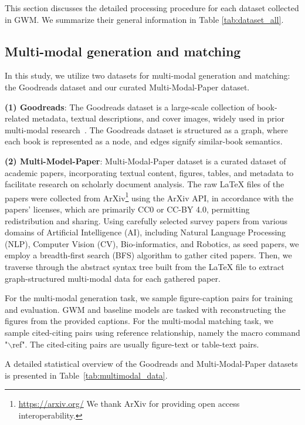 This section discusses the detailed processing procedure for each dataset collected in GWM. We summarize their general information in Table \ref{tab:dataset_all}.

\subsection{Multi-modal generation and matching} \label{ap:multi-modal generation and matching g}

 In this study, we utilize two datasets for multi-modal generation and matching: the Goodreads dataset \cite{wan-etal-2019-fine} and our curated Multi-Modal-Paper dataset. 

\textbf{(1) Goodreads}: The Goodreads dataset is a large-scale collection of book-related metadata, textual descriptions, and cover images, widely used in prior multi-modal research~\cite{jin2024instructg2i}. 
The Goodreads dataset is structured as a graph, where each book is represented as a node, and edges signify similar-book semantics.

\textbf{(2) Multi-Model-Paper}: Multi-Modal-Paper dataset is a curated dataset of academic papers, incorporating textual content, figures, tables, and metadata to facilitate research on scholarly document analysis. The raw LaTeX files of the papers were collected from ArXiv\footnote{\href{https://arxiv.org/}{https://arxiv.org/} We thank ArXiv for providing open access interoperability.} using the ArXiv API, in accordance with the papers' licenses, which are primarily CC0 or CC-BY 4.0, permitting redistribution and sharing. Using carefully selected survey papers from various domains of Artificial Intelligence (AI), including Natural Language Processing (NLP), Computer Vision (CV), Bio-informatics, and Robotics, as seed papers, we employ a breadth-first search (BFS) algorithm to gather cited papers. Then, we traverse through the abstract syntax tree built from the LaTeX file to extract graph-structured multi-modal data for each gathered paper. 

For the multi-modal generation task, we sample figure-caption pairs for training and evaluation. GWM and baseline models are tasked with reconstructing the figures from the provided captions. For the multi-modal matching task, we sample cited-citing pairs using reference relationship, namely the macro command "$\backslash$ref". The cited-citing pairs are usually figure-text or table-text pairs.

A detailed statistical overview of the Goodreads and Multi-Modal-Paper datasets is presented in Table~\ref{tab:multimodal_data}.

